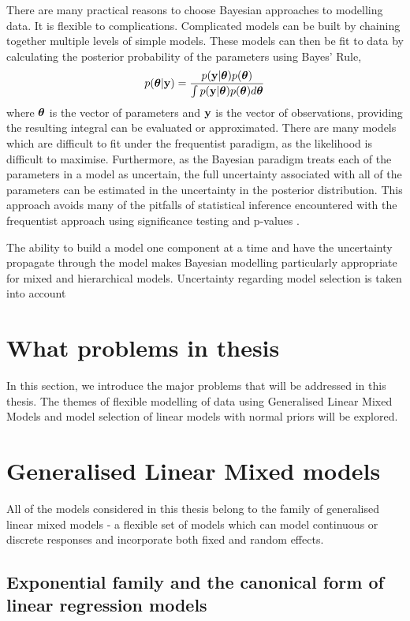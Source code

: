 There are many practical reasons to choose Bayesian approaches to modelling data.
It is flexible to complications. Complicated models can be built by chaining together multiple levels of
simple models. These models can then be fit to data by calculating the posterior probability of the
parameters using Bayes' Rule,
\[
	p({\boldsymbol \theta} | {\bf y}) = \frac{p({\bf y} | {\boldsymbol \theta}) p({\boldsymbol \theta})}{\int p({\bf y} | {\boldsymbol \theta}) p({\boldsymbol \theta}) d {\boldsymbol \theta}}
\]
where ${\boldsymbol \theta}$ is the vector of parameters and ${\bf y}$ is the vector of observations, providing the resulting
integral can be evaluated or approximated. There are many models which are difficult to fit under the
frequentist paradigm, as the likelihood is difficult to maximise. Furthermore, as the Bayesian paradigm treats
each of the parameters in a model as uncertain, the full uncertainty associated with all of the parameters can
be estimated in the uncertainty in the posterior distribution. This approach avoids many of the pitfalls of
statistical inference encountered with the frequentist approach using significance testing and p-values
\citep{Cox2005}.

The ability to build a model one component at a time and have the uncertainty propagate through the model makes Bayesian
modelling  particularly appropriate for mixed and hierarchical models. Uncertainty regarding model selection
is taken into account

\section{What problems in thesis}

In this section, we introduce the major problems that will be addressed in this thesis. The themes of flexible
modelling of data using Generalised Linear Mixed Models and model selection of linear models with normal
priors  will be explored.

\section{Generalised Linear Mixed models}
All of the models considered in this thesis belong to the family of generalised linear mixed models - a
flexible set of models which can model continuous or discrete responses and incorporate both fixed and
random effects.

\subsection{Exponential family and the canonical form of linear regression models}

